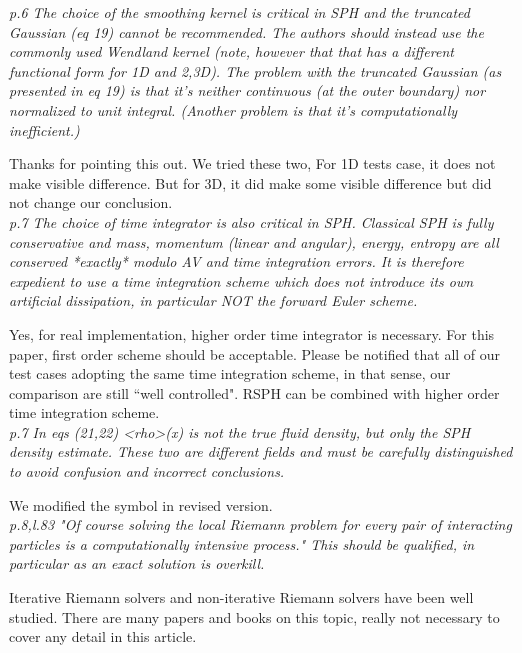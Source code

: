 \documentclass[10pt,a4paper]{article}
\begin{document}
\textit{p.6 The choice of the smoothing kernel is critical in SPH and the truncated Gaussian (eq 19) cannot be recommended. The authors should instead use the commonly used Wendland kernel (note, however that that has a different functional form for 1D and 2,3D). The problem with the truncated Gaussian (as presented in eq 19) is that it's neither continuous (at the outer boundary) nor normalized to unit integral. (Another problem is that it's computationally inefficient.)}

Thanks for pointing this out. We tried these two, For 1D tests case, it does not make visible difference. But for 3D, it did make some visible difference but did not change our conclusion. 
\\[3pt]

\textit{p.7 The choice of time integrator is also critical in SPH. Classical SPH is fully conservative and mass, momentum (linear and angular), energy, entropy are all conserved *exactly* modulo AV and time integration errors. It is therefore expedient to use a time integration scheme which does not introduce its own artificial dissipation, in particular NOT the forward Euler scheme.}

Yes, for real implementation, higher order time integrator is necessary. For this paper, first order scheme should be acceptable. Please be notified that all of our test cases adopting the same time integration scheme, in that sense, our comparison are still ``well controlled". RSPH can be combined with higher order time integration scheme. 
\\[3pt]

\textit{p.7 In eqs (21,22) <rho>(x) is not the true fluid density, but only the SPH density estimate. These two are different fields and must be carefully distinguished to avoid confusion and incorrect conclusions.}

We modified the symbol in revised version.
\\[3pt]

\textit{p.8,l.83 "Of course solving the local Riemann problem for every pair of interacting particles is a computationally intensive process." This should be qualified, in particular as an exact solution is overkill.}

Iterative Riemann solvers and non-iterative Riemann solvers have been well studied. There are many papers \citep[][e.g.]{roe1981approximate} and books \citep[][e.g.]{toro2013riemann} on this topic, really not necessary to cover any detail in this article.
\\[3pt]
\end{document}
